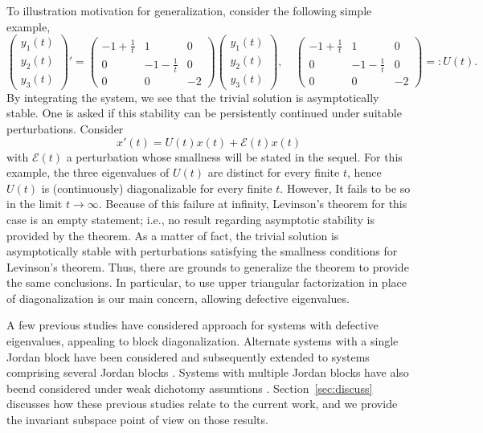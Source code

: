 \documentclass[a4paper,11pt]{article}
\newcommand{\E}{\mathcal{E}}
\theoremstyle{remark}
\begin{document}
To illustration motivation for generalization, consider	the following simple example,
\begin{equation}\label{eq:ex}
\begin{pmatrix} y_1(t) \\ y_2(t) \\ y_3(t) \end{pmatrix}' = \begin{pmatrix} -1 + \frac{1}{t} & 1 & 0 \\0 & -1- \frac{1}{t} & 0 \\ 0 & 0 & -2\end{pmatrix} \begin{pmatrix} y_1(t) \\ y_2(t) \\ y_3(t) \end{pmatrix}, \quad \begin{pmatrix} -1 + \frac{1}{t} & 1 & 0 \\0 & -1- \frac{1}{t} & 0 \\ 0 & 0 & -2\end{pmatrix}=:U(t).
\end{equation}
By integrating the system, we see that the trivial solution is asymptotically stable. One is asked if this stability can be persistently continued under suitable perturbations. Consider
$$ x'(t) = U(t)x(t) + \E(t)x(t)$$
with $\E(t)$ a perturbation whose smallness will be stated in the sequel. For this example, the three eigenvalues of $U(t)$ are distinct for every finite $t$, hence $U(t)$ is (continuously) diagonalizable  for every  finite $t$. However, It fails to be so in the limit $t \rightarrow \infty$. Because of this failure at infinity, Levinson's theorem for this case is an empty statement; i.e., no result regarding asymptotic stability is provided by the theorem. As a matter of fact, the trivial solution is asymptotically stable with perturbations satisfying the smallness conditions for Levinson's theorem. Thus, there are grounds to generalize the theorem to provide the same conclusions. In particular, to use upper triangular factorization in place of diagonalization is our main concern, allowing defective eigenvalues.



A few previous studies have considered approach for systems with defective eigenvalues, appealing to block diagonalization. Alternate systems with a single Jordan block have been considered \cite{E89} and subsequently extended to systems comprising several Jordan blocks \cite{DK72,BL15}. Systems with multiple Jordan blocks have also beend considered under weak dichotomy assumtions \cite{CK70, BL10}. Section~\ref{sec:discuss}  discusses how these previous studies relate to the current work, and we provide the invariant subspace point of view on those results.
\end{document}
